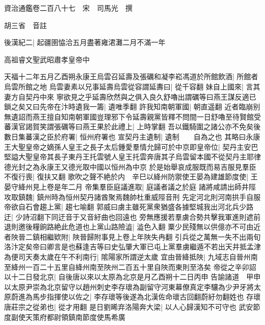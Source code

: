 資治通鑑卷二百八十七　宋　司馬光　撰

胡三省　音註

後漢紀二|{
	起疆圉恊洽五月盡著雍涒灘二月不滿一年}


高祖睿文聖武昭肅孝皇帝中

天福十二年五月乙酉朔永康王烏雲召延壽及張礪和凝李崧馮道於所館飲酒|{
	所館者烏雲所館之地}
烏雲妻素以兄事延壽烏雲從容謂延夀曰|{
	從千容翻}
妹自上國來|{
	言其妻方自契丹中來}
寧欲見之乎延壽欣然與之俱入良久舒嚕出謂礪等曰燕王謀反適已鎖之矣又曰先帝在汴時遺我一籌|{
	遺唯季翻}
許我知南朝軍國|{
	朝直遥翻}
近者臨崩别無遺詔而燕王擅自知南朝軍國豈理邪下令延壽親黨皆釋不問間一日舒嚕至待賢館受蕃漢官謁賀笑謂張礪等曰燕王果於此禮上|{
	上時掌翻}
吾以鐵騎圍之諸公亦不免矣後數日集蕃漢之臣於府署|{
	恒州府署也}
宣契丹主遺制|{
	遺制　　自為之也}
其略曰永康王大聖皇帝之嫡孫人皇王之長子太后鍾愛羣情允歸可於中京即皇帝位|{
	契丹主安巴堅謚大聖皇帝其長子東丹王托雲號人皇王托雲奔唐其子烏雲留本國不從契丹主耶律德光封之為永康王又德光取中國以恒州為中京}
於是始舉哀成服既而易吉服見羣臣不復行喪|{
	復扶又翻}
歌吹之聲不絶於内　辛巳以絳州防禦使王晏為建雄節度使|{
	王晏守絳州見上卷是年二月}
帝集羣臣庭議進取|{
	庭議者議之於庭}
諸將咸請出師井陘攻取鎮魏|{
	鎮州時為恒州契丹諸酋聚焉魏帥杜重威陘音刑}
先定河北則河南拱手自服帝欲自石會趨上黨|{
	趨七喻翻}
郭威曰虜主雖死黨衆猶盛各據堅城我出河北兵少路迂|{
	少詩沼翻下同迂音于又音紆曲也回遠也}
旁無應援若羣虜合勢共擊我軍進則遮前退則邀後糧餉路絶此危道也上黨山路險澁|{
	澁色入翻}
粟少民殘無以供億亦不可由近者陜晉二鎮相繼欵附|{
	陜晉歸附事見上卷上年陜失冉翻}
引兵從之萬無一失不出兩旬洛汴定矣帝曰卿言是也蘇逢吉等曰史弘肇大軍已屯上黨羣虜繼遁不若出天井抵孟津為便司天奏太歲在午不利南行|{
	隂陽家所謂逆太歲}
宜由晉絳抵陜|{
	九域志自晉州南至絳州一百二十五里自絳州南至陜州二百五十里自陜而東則至洛矣}
帝從之辛卯詔以十二日發北京|{
	自後唐以來以太原為北京是月乙酉朔十二日丙申}
告諭諸道　甲申以太原尹崇為北京留守以趙州刺史李存瓌為副留守河東幕僚真定李驤為少尹牙將太原蔚進為馬步指揮使以佐之|{
	李存瓌等後遂為北漢佐命瓌古回翻蔚紆勿翻姓也}
存瓌唐莊宗之從弟也|{
	從才用翻}
是日劉晞弃洛陽奔大梁|{
	以人心歸漢知不可守也}
武安節度副使天策府都尉領鎮南節度使馬希廣

